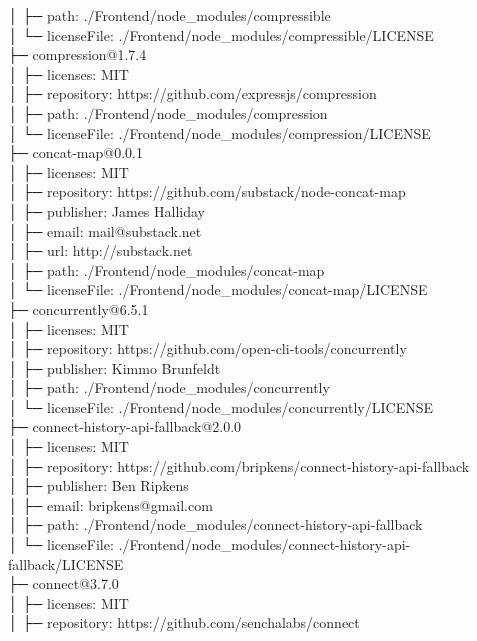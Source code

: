 │  ├─ path: ./Frontend/node\_modules/compressible\\
│  └─ licenseFile: ./Frontend/node\_modules/compressible/LICENSE\\
├─ compression@1.7.4\\
│  ├─ licenses: MIT\\
│  ├─ repository: https://github.com/expressjs/compression\\
│  ├─ path: ./Frontend/node\_modules/compression\\
│  └─ licenseFile: ./Frontend/node\_modules/compression/LICENSE\\
├─ concat-map@0.0.1\\
│  ├─ licenses: MIT\\
│  ├─ repository: https://github.com/substack/node-concat-map\\
│  ├─ publisher: James Halliday\\
│  ├─ email: mail@substack.net\\
│  ├─ url: http://substack.net\\
│  ├─ path: ./Frontend/node\_modules/concat-map\\
│  └─ licenseFile: ./Frontend/node\_modules/concat-map/LICENSE\\
├─ concurrently@6.5.1\\
│  ├─ licenses: MIT\\
│  ├─ repository: https://github.com/open-cli-tools/concurrently\\
│  ├─ publisher: Kimmo Brunfeldt\\
│  ├─ path: ./Frontend/node\_modules/concurrently\\
│  └─ licenseFile: ./Frontend/node\_modules/concurrently/LICENSE\\
├─ connect-history-api-fallback@2.0.0\\
│  ├─ licenses: MIT\\
│  ├─ repository: https://github.com/bripkens/connect-history-api-fallback\\
│  ├─ publisher: Ben Ripkens\\
│  ├─ email: bripkens@gmail.com\\
│  ├─ path: ./Frontend/node\_modules/connect-history-api-fallback\\
│  └─ licenseFile: ./Frontend/node\_modules/connect-history-api-fallback/LICENSE\\
├─ connect@3.7.0\\
│  ├─ licenses: MIT\\
│  ├─ repository: https://github.com/senchalabs/connect\\
